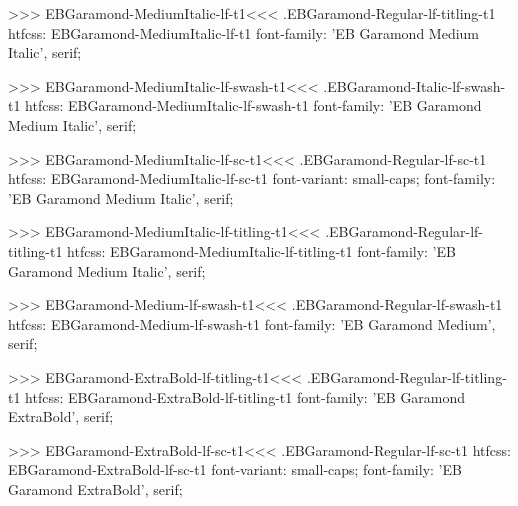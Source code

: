 {{{{{{{>>>
\<EBGaramond-MediumItalic-lf-t1\><<<
.EBGaramond-Regular-lf-titling-t1
htfcss:  EBGaramond-MediumItalic-lf-t1  font-family: 'EB Garamond Medium Italic', serif;

>>>
\<EBGaramond-MediumItalic-lf-swash-t1\><<<
.EBGaramond-Italic-lf-swash-t1
htfcss:  EBGaramond-MediumItalic-lf-swash-t1  font-family: 'EB Garamond Medium Italic', serif;

>>>
\<EBGaramond-MediumItalic-lf-sc-t1\><<<
.EBGaramond-Regular-lf-sc-t1
htfcss:  EBGaramond-MediumItalic-lf-sc-t1  font-variant: small-caps; font-family: 'EB Garamond Medium Italic', serif;

>>>
\<EBGaramond-MediumItalic-lf-titling-t1\><<<
.EBGaramond-Regular-lf-titling-t1
htfcss:  EBGaramond-MediumItalic-lf-titling-t1  font-family: 'EB Garamond Medium Italic', serif;

>>>
\<EBGaramond-Medium-lf-swash-t1\><<<
.EBGaramond-Regular-lf-swash-t1
htfcss:  EBGaramond-Medium-lf-swash-t1  font-family: 'EB Garamond Medium', serif;

>>>
\<EBGaramond-ExtraBold-lf-titling-t1\><<<
.EBGaramond-Regular-lf-titling-t1
htfcss:  EBGaramond-ExtraBold-lf-titling-t1  font-family: 'EB Garamond ExtraBold', serif;

>>>
\<EBGaramond-ExtraBold-lf-sc-t1\><<<
.EBGaramond-Regular-lf-sc-t1
htfcss:  EBGaramond-ExtraBold-lf-sc-t1  font-variant: small-caps; font-family: 'EB Garamond ExtraBold', serif;

}}}}}}}
